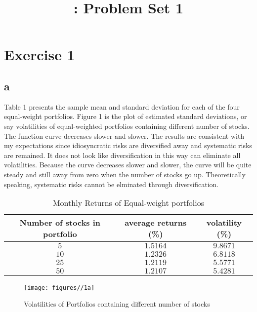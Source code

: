 \documentclass{report}
\title{\LectureTitle: Problem Set 1}
\begin{document}
\maketitle
\newpage

\section{Exercise 1}

\subsection{a}

Table 1 presents the sample mean and standard deviation for each of the four equal-weight portfolios. Figure 1 is the plot of estimated standard deviations, or say volatilities of equal-weighted portfolios containing different number of stocks. The function curve decreases slower and slower. The results are consistent with my expectations since idiosyncratic risks are diversified away and systematic risks are remained. It does not look like diversification in this way can eliminate all volatilities. Because the curve decreases slower and slower, the curve will be quite steady and still away from zero when the number of stocks go up. Theoretically speaking, systematic risks cannot be elminated through diversification.
\begin{table}[H]
\centering
\begin{tabular}{|c|c|c|}
\hline
Number of stocks in portfolio&average returns (\%) &volatility (\%)\\
\hline
$5$& $1.5164$ & $9.8671$ \\
\hline
$10$& $1.2326$ & $6.8118$ \\
\hline
$25$& $1.2119$ & $5.5771$ \\
\hline
$50$& $1.2107$ & $5.4281$ \\
\hline
\end{tabular}
\caption{ Monthly Returns of Equal-weight portfolios}
\end{table}

\begin{figure}[H]
        \centering 
         \texttt{[image: figures//1a]}
         \caption{ Volatilities of Portfolios containing different number of stocks}
\end{figure}
\end{document}
